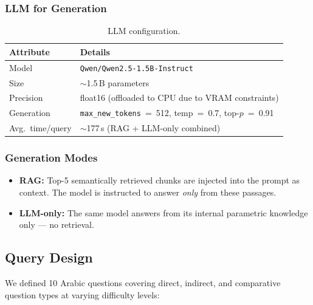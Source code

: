 \documentclass[12pt, a4paper]{article}
\renewcommand{\arraystretch}{1.12}
\begin{document}
\subsubsection{LLM for Generation}

\begin{table}[H]
\centering
\renewcommand{\arraystretch}{1.3}
\begin{tabular}{l l}
\toprule
\textbf{Attribute} & \textbf{Details} \\
\midrule
Model              & \texttt{Qwen/Qwen2.5-1.5B-Instruct} \\
Size               & $\sim$1.5\,B parameters \\
Precision          & float16 (offloaded to CPU due to VRAM constraints) \\
Generation         & \texttt{max\_new\_tokens}~=~512, temp~=~0.7, top-$p$~=~0.91 \\
Avg.\ time/query   & $\sim$177\,s (RAG + LLM-only combined) \\
\bottomrule
\end{tabular}
\caption{LLM configuration.}
\label{tab:p4_llm}
\end{table}

\subsubsection{Generation Modes}

\begin{itemize}
    \item \textbf{RAG:} Top-5 semantically retrieved chunks are injected into the
          prompt as context.  The model is instructed to answer \emph{only} from
          these passages.
    \item \textbf{LLM-only:} The same model answers from its internal parametric
          knowledge only --- no retrieval.
\end{itemize}

\subsection{Query Design}

We defined 10 Arabic questions covering direct, indirect, and comparative
question types at varying difficulty levels:
\end{document}
